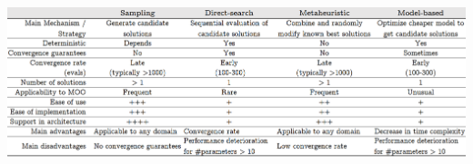 		\begin{table}[]	
		\centering	
		\caption{Comparison between the derivative-free algorithms' classes.}	
		\includegraphics[width=1\textwidth]{tables_and_code/algorithms_comparison.PNG}

\end{table}
